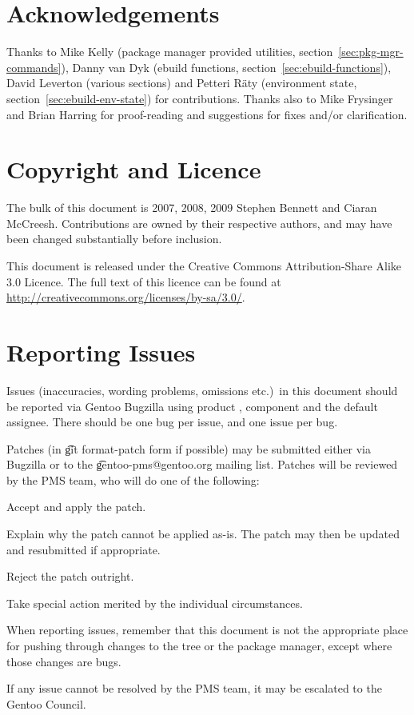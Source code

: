 \section*{Acknowledgements}

Thanks to Mike Kelly (package manager provided utilities, section~\ref{sec:pkg-mgr-commands}),
Danny van Dyk (ebuild functions, section~\ref{sec:ebuild-functions}), David Leverton (various
sections) and Petteri Räty (environment state, section~\ref{sec:ebuild-env-state}) for
contributions. Thanks also to Mike Frysinger and Brian Harring for proof-reading and suggestions
for fixes and/or clarification.

\section*{Copyright and Licence}

The bulk of this document is \textcopyright{} 2007, 2008, 2009 Stephen Bennett and Ciaran McCreesh.
Contributions are owned by their respective authors, and may have been changed substantially before
inclusion.

This document is released under the Creative Commons Attribution-Share Alike 3.0 Licence. The full
text of this licence can be found at \url{http://creativecommons.org/licenses/by-sa/3.0/}.

\section*{Reporting Issues}

Issues (inaccuracies, wording problems, omissions etc.)\ in this document should be reported via
Gentoo Bugzilla using product , component  and the default
assignee. There should be one bug per issue, and one issue per bug.

Patches (in \t{git format-patch} form if possible) may be submitted either via Bugzilla or to the
\t{gentoo-pms@gentoo.org} mailing list. Patches will be reviewed by the PMS team, who will do one of
the following:

\begin{compactitem}
\item Accept and apply the patch.
\item Explain why the patch cannot be applied as-is. The patch may then be updated and resubmitted
if \mbox{appropriate}.
\item Reject the patch outright.
\item Take special action merited by the individual circumstances.
\end{compactitem}

When reporting issues, remember that this document is not the appropriate place for pushing
through changes to the tree or the package manager, except where those changes are bugs.

If any issue cannot be resolved by the PMS team, it may be escalated to the Gentoo Council.


